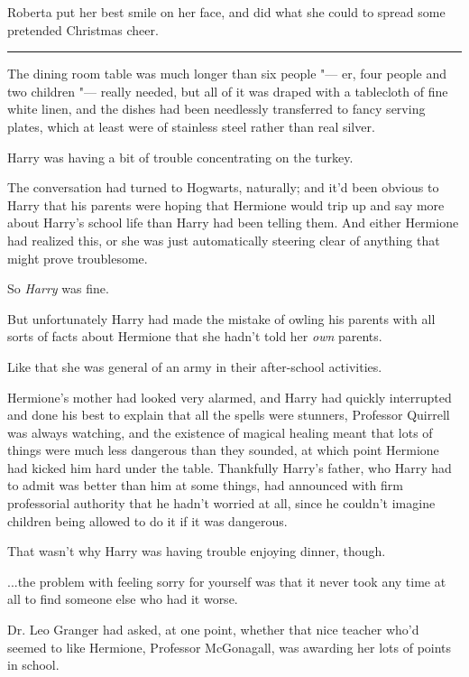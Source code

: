 Roberta put her best smile on her face, and did what she could to spread
some pretended Christmas cheer.

\begin{center}\rule{3in}{0.4pt}\end{center}

The dining room table was much longer than six people "--- er, four people
and two children "--- really needed, but all of it was draped with a
tablecloth of fine white linen, and the dishes had been needlessly
transferred to fancy serving plates, which at least were of stainless
steel rather than real silver.

Harry was having a bit of trouble concentrating on the turkey.

The conversation had turned to Hogwarts, naturally; and it'd been
obvious to Harry that his parents were hoping that Hermione would trip
up and say more about Harry's school life than Harry had been telling
them. And either Hermione had realized this, or she was just
automatically steering clear of anything that might prove troublesome.

So \emph{Harry} was fine.

But unfortunately Harry had made the mistake of owling his parents with
all sorts of facts about Hermione that she hadn't told her \emph{own}
parents.

Like that she was general of an army in their after-school activities.

Hermione's mother had looked very alarmed, and Harry had quickly
interrupted and done his best to explain that all the spells were
stunners, Professor Quirrell was always watching, and the existence of
magical healing meant that lots of things were much less dangerous than
they sounded, at which point Hermione had kicked him hard under the
table. Thankfully Harry's father, who Harry had to admit was better than
him at some things, had announced with firm professorial authority that
he hadn't worried at all, since he couldn't imagine children being
allowed to do it if it was dangerous.

That wasn't why Harry was having trouble enjoying dinner, though.

...the problem with feeling sorry for yourself was that it never
took any time at all to find someone else who had it worse.

Dr. Leo Granger had asked, at one point, whether that nice teacher who'd
seemed to like Hermione, Professor McGonagall, was awarding her lots of
points in school.

